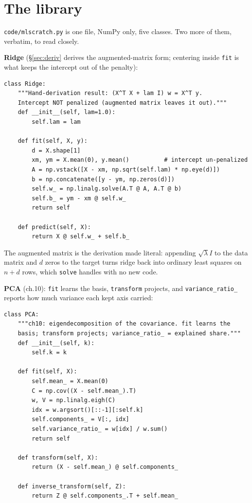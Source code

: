\section{The library}\label{sec:library}

\texttt{code/mlscratch.py} is one file, NumPy only, five classes.
Two more of them, verbatim, to read closely.

\textbf{Ridge} (\S\ref{sec:deriv} derives the augmented-matrix form;
centering inside \texttt{fit} is what keeps the intercept out of the
penalty):

\begin{lstlisting}[caption={\ttfamily from code/mlscratch.py --- the Ridge class}]
class Ridge:
    """Hand-derivation result: (X^T X + lam I) w = X^T y.
    Intercept NOT penalized (augmented matrix leaves it out)."""
    def __init__(self, lam=1.0):
        self.lam = lam

    def fit(self, X, y):
        d = X.shape[1]
        xm, ym = X.mean(0), y.mean()          # intercept un-penalized
        A = np.vstack([X - xm, np.sqrt(self.lam) * np.eye(d)])
        b = np.concatenate([y - ym, np.zeros(d)])
        self.w_ = np.linalg.solve(A.T @ A, A.T @ b)
        self.b_ = ym - xm @ self.w_
        return self

    def predict(self, X):
        return X @ self.w_ + self.b_
\end{lstlisting}

The augmented matrix is the derivation made literal: appending
$\sqrt\lambda I$ to the data matrix and $d$ zeros to the target
turns ridge back into ordinary least squares on $n+d$ rows, which
\texttt{solve} handles with no new code.

\textbf{PCA} (ch.10): \texttt{fit} learns the basis,
\texttt{transform} projects, and \texttt{variance\_ratio\_} reports
how much variance each kept axis carried:

\begin{lstlisting}[caption={\ttfamily from code/mlscratch.py --- the PCA class}]
class PCA:
    """ch10: eigendecomposition of the covariance. fit learns the
    basis; transform projects; variance_ratio_ = explained share."""
    def __init__(self, k):
        self.k = k

    def fit(self, X):
        self.mean_ = X.mean(0)
        C = np.cov((X - self.mean_).T)
        w, V = np.linalg.eigh(C)
        idx = w.argsort()[::-1][:self.k]
        self.components_ = V[:, idx]
        self.variance_ratio_ = w[idx] / w.sum()
        return self

    def transform(self, X):
        return (X - self.mean_) @ self.components_

    def inverse_transform(self, Z):
        return Z @ self.components_.T + self.mean_
\end{lstlisting}


